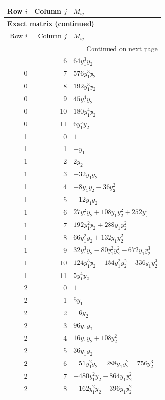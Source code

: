 \documentclass[10pt,a4paper]{article}
\begin{document}
{\small\setlength{\tabcolsep}{7pt}\begin{longtable}{rrp{125mm}}
\toprule Row $i$ & Column $j$ & $M_{ij}$\\\midrule\endfirsthead
\multicolumn{3}{l}{\textbf{Exact matrix (continued)}}\\
\toprule Row $i$ & Column $j$ & $M_{ij}$\\\midrule\endhead
\midrule\multicolumn{3}{r}{Continued on next page}\\\endfoot\bottomrule\endlastfoot
0 & 6 & $64 y_{1}^{3} y_{2}$\\
0 & 7 & $576 y_{1}^{3} y_{2}$\\
0 & 8 & $192 y_{1}^{3} y_{2}$\\
0 & 9 & $45 y_{1}^{4} y_{2}$\\
0 & 10 & $180 y_{1}^{4} y_{2}$\\
0 & 11 & $6 y_{1}^{5} y_{2}$\\
1 & 0 & $1$\\
1 & 1 & $- y_{1}$\\
1 & 2 & $2 y_{2}$\\
1 & 3 & $- 32 y_{1} y_{2}$\\
1 & 4 & $- 8 y_{1} y_{2} - 36 y_{2}^{2}$\\
1 & 5 & $- 12 y_{1} y_{2}$\\
1 & 6 & $27 y_{1}^{2} y_{2} + 108 y_{1} y_{2}^{2} + 252 y_{2}^{3}$\\
1 & 7 & $192 y_{1}^{2} y_{2} + 288 y_{1} y_{2}^{2}$\\
1 & 8 & $66 y_{1}^{2} y_{2} + 132 y_{1} y_{2}^{2}$\\
1 & 9 & $32 y_{1}^{3} y_{2} - 80 y_{1}^{2} y_{2}^{2} - 672 y_{1} y_{2}^{3}$\\
1 & 10 & $124 y_{1}^{3} y_{2} - 184 y_{1}^{2} y_{2}^{2} - 336 y_{1} y_{2}^{3}$\\
1 & 11 & $5 y_{1}^{4} y_{2}$\\
2 & 0 & $1$\\
2 & 1 & $5 y_{1}$\\
2 & 2 & $- 6 y_{2}$\\
2 & 3 & $96 y_{1} y_{2}$\\
2 & 4 & $16 y_{1} y_{2} + 108 y_{2}^{2}$\\
2 & 5 & $36 y_{1} y_{2}$\\
2 & 6 & $- 51 y_{1}^{2} y_{2} - 288 y_{1} y_{2}^{2} - 756 y_{2}^{3}$\\
2 & 7 & $- 480 y_{1}^{2} y_{2} - 864 y_{1} y_{2}^{2}$\\
2 & 8 & $- 162 y_{1}^{2} y_{2} - 396 y_{1} y_{2}^{2}$\\

\end{longtable}}
\end{document}
